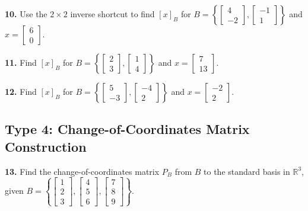 \documentclass{article}
\begin{document}
\vspace{0.2cm}
\textbf{10.} Use the $2 \times 2$ inverse shortcut to find $[x]_B$ for $B = \left\{ \begin{bmatrix} 4 \\ -2 \end{bmatrix}, \begin{bmatrix} -1 \\ 1 \end{bmatrix} \right\}$ and $x = \begin{bmatrix} 6 \\ 0 \end{bmatrix}$.

\vspace{0.2cm}
\textbf{11.} Find $[x]_B$ for $B = \left\{ \begin{bmatrix} 2 \\ 3 \end{bmatrix}, \begin{bmatrix} 1 \\ 4 \end{bmatrix} \right\}$ and $x = \begin{bmatrix} 7 \\ 13 \end{bmatrix}$.

\vspace{0.2cm}
\textbf{12.} Find $[x]_B$ for $B = \left\{ \begin{bmatrix} 5 \\ -3 \end{bmatrix}, \begin{bmatrix} -4 \\ 2 \end{bmatrix} \right\}$ and $x = \begin{bmatrix} -2 \\ 2 \end{bmatrix}$.

\subsection*{Type 4: Change-of-Coordinates Matrix Construction}
\textbf{13.} Find the change-of-coordinates matrix $P_B$ from $B$ to the standard basis in $\mathbb{R}^3$, given $B = \left\{ \begin{bmatrix} 1 \\ 2 \\ 3 \end{bmatrix}, \begin{bmatrix} 4 \\ 5 \\ 6 \end{bmatrix}, \begin{bmatrix} 7 \\ 8 \\ 9 \end{bmatrix} \right\}$.
\end{document}
